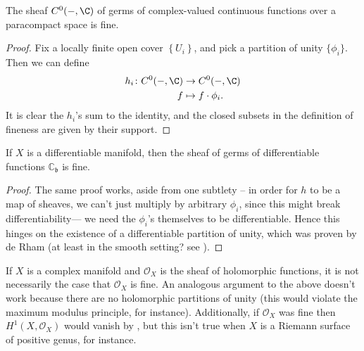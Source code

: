 \documentclass[11pt]{book}
\begin{document}


\begin{example}\label{exa:cx-valued-cts-funcs-is-fine} 
The sheaf $C^0(-,\C)$ of germs of complex-valued continuous functions over a paracompact space is fine.
\end{example}
\begin{proof} Fix a locally finite open cover $\left\{ U_i \right\}$, and pick a partition of unity $\{\phi_i\}$. Then we can define
\begin{align*}
    h_i \colon C^0(-,\C) &\to C^0(-,\C) \\
    f &\mapsto f\cdot \phi_i.
\end{align*}
It is clear the $h_i$'s sum to the identity, and the closed subsets in the definition of fineness are given by their support.
\end{proof}

\begin{example} If $X$ is a differentiable manifold, then the sheaf of germs of differentiable functions $\mathbb{C}_{\mathfrak{b}}$ is fine.
\end{example}
\begin{proof} The same proof works, aside from one subtlety -- in order for $h$ to be a map of sheaves, we can't just multiply by arbitrary $\phi_i$, since this might break differentiability--- we need the $\phi_i$'s themselves to be differentiable. Hence this hinges on the existence of a differentiable partition of unity, which was proven by de Rham (at least in the smooth setting? see \cite[I.2]{derhamDifferentiableManifolds1984}). 
\end{proof}

\begin{remark} If $X$ is a complex manifold and $\mathcal{O}_X$ is the sheaf of holomorphic functions, it is not necessarily the case that $\mathcal{O}_X$ is fine. An analogous argument to the above doesn't work because there are no holomorphic partitions of unity (this would violate the maximum modulus principle, for instance). Additionally, if $\mathcal{O}_X$ was fine then $H^1(X,\mathcal{O}_X)$ would vanish by , but this isn't true when $X$ is a Riemann surface of positive genus, for instance.
\end{remark}
\end{document}
